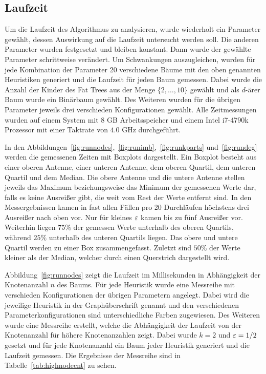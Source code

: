 \subsection{Laufzeit}\label{sec:exprun}
Um die Laufzeit des Algorithmus zu analysieren, wurde wiederholt ein Parameter gewählt, dessen Auswirkung auf die Laufzeit untersucht werden soll.
Die anderen Parameter wurden festgesetzt und bleiben konstant.
Dann wurde der gewählte Parameter schrittweise verändert.
Um Schwankungen auszugleichen, wurden für jede Kombination der Parameter 20 verschiedene Bäume mit den oben genannten Heuristiken generiert und die Laufzeit für jeden Baum gemessen.
Dabei wurde die Anzahl der Kinder des Fat Trees aus der Menge $\{2, \ldots, 10\}$ gewählt und als $d$\hyp ärer Baum wurde ein Binärbaum gewählt.
Des Weiteren wurden für die übrigen Parameter jeweils drei verschieden Konfigurationen gewählt.
Alle Zeitmessungen wurden auf einem System mit $8$ GB Arbeitsspeicher und einem Intel i7-4790k Prozessor mit einer Taktrate von $4.0$ GHz durchgeführt.

In den Abbildungen~\ref{fig:runnodes},~\ref{fig:runimb},~\ref{fig:runkparts} und~\ref{fig:rundeg} werden die gemessenen Zeiten mit Boxplots dargestellt.
Ein Boxplot besteht aus einer oberen Antenne, einer unteren Antenne, dem oberen Quartil, dem unteren Quartil und dem Median.
 Die obere Antenne und die untere Antenne stellen jeweils das Maximum beziehungsweise das Minimum der gemessenen Werte dar, falls es keine Ausreißer gibt, die weit vom Rest der Werte entfernt sind.
In den Messergebnissen kamen in fast allen Fällen pro 20 Durchläufen höchstens drei Ausreißer nach oben vor.
Nur für kleines $\varepsilon$ kamen bis zu fünf Ausreißer vor.
Weiterhin liegen $75\%$ der gemessen Werte unterhalb des oberen Quartils, während $25\%$ unterhalb des unteren Quartils liegen.
Das obere und untere Quartil werden zu einer Box zusammengefasst.
Zuletzt sind $50\%$ der Werte kleiner als der Median, welcher durch einen Querstrich dargestellt wird.

Abbildung~\ref{fig:runnodes} zeigt die Laufzeit im Millisekunden in Abhängigkeit der Knotenanzahl $n$ des Baums.
Für jede Heuristik wurde eine Messreihe mit verschieden Konfigurationen der übrigen Parametern angelegt.
Dabei wird die jeweilige Heuristik in der Graphüberschrift genannt und den verschiedenen Parameterkonfigurationen sind unterschiedliche Farben zugewiesen. 
Des Weiteren wurde eine Messreihe erstellt, welche die Abhängigkeit der Laufzeit von der Knotenanzahl für höhere Knotenanzahlen zeigt.
Dabei wurde $k=2$ und $\varepsilon=1/2$ gesetzt und für jede Knotenanzahl ein Baum jeder Heuristik generiert und die Laufzeit gemessen.
Die Ergebnisse der Messreihe sind in Tabelle~\ref{tab:highnodecnt} zu sehen.

